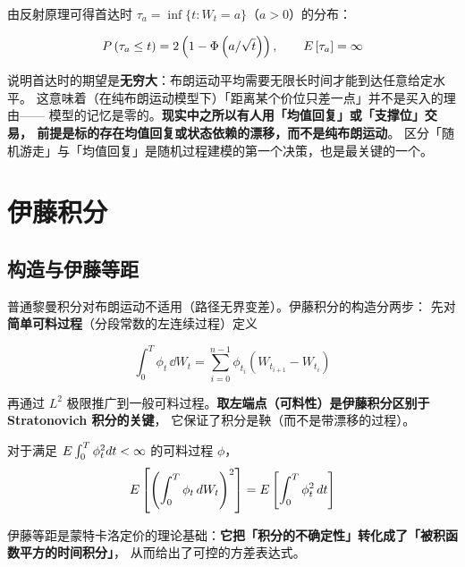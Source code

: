 由反射原理可得首达时 $\tau_a = \inf\{t: W_t = a\}$（$a>0$）的分布：

\begin{equation}
  P\left(\tau_a\le t\right) = 2\left(1-\Phi\left(a/\sqrt{t}\right)\right),
  \qquad E\left[\tau_a\right] = \infty
  \label{eq:10-hitting}
\end{equation}

\begin{intuitionbox}
 说明首达时的期望是\textbf{无穷大}：布朗运动平均需要无限长时间才能到达任意给定水平。
这意味着（在纯布朗运动模型下）「距离某个价位只差一点」并不是买入的理由——
模型的记忆是零的。\textbf{现实中之所以有人用「均值回复」或「支撑位」交易，
前提是标的存在均值回复或状态依赖的漂移，而不是纯布朗运动}。
区分「随机游走」与「均值回复」是随机过程建模的第一个决策，也是最关键的一个。
\end{intuitionbox}

\section{伊藤积分}

\subsection{构造与伊藤等距}

普通黎曼积分对布朗运动不适用（路径无界变差）。伊藤积分的构造分两步：
先对\textbf{简单可料过程}（分段常数的左连续过程）定义

\begin{equation}
  \int_0^{T}\phi_t\,\dd W_t = \sum_{i=0}^{n-1}\phi_{t_i}\left(W_{t_{i+1}}-W_{t_i}\right)
  \label{eq:10-simple}
\end{equation}

再通过 $L^2$ 极限推广到一般可料过程。\textbf{取左端点（可料性）是伊藤积分区别于 Stratonovich 积分的关键}，
它保证了积分是鞅（而不是带漂移的过程）。

\begin{theorem}[伊藤等距]\label{thm:10-isometry}
对于满足 $E\int_0^T\phi_t^2d t<\infty$ 的可料过程 $\phi$，
\begin{equation}
  E\left[\left(\int_0^{T}\phi_t\,d W_t\right)^{2}\right]
  = E\left[\int_0^{T}\phi_t^{2}\,d t\right]
  \label{eq:10-isometry}
\end{equation}
\end{theorem}

伊藤等距是蒙特卡洛定价的理论基础：\textbf{它把「积分的不确定性」转化成了「被积函数平方的时间积分」}，
从而给出了可控的方差表达式。

